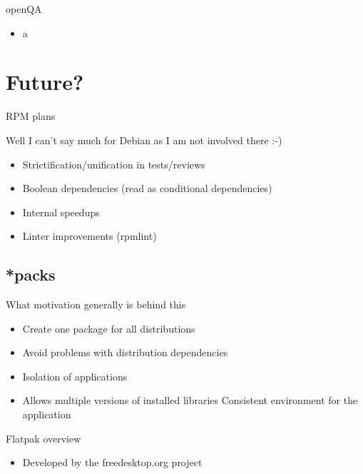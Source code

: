 \documentclass{beamer}
\begin{document}
\begin{frame}[t]{openQA}
	\begin{itemize}
	\item a
	\end{itemize}
\end{frame}

\section{Future?}

\begin{frame}[t]{RPM plans}
    \begin{center}Well I can't say much for Debian as I am not involved there :-)\end{center}
	\begin{itemize}
	\item Strictification/unification in tests/reviews
	\item Boolean dependencies (read as conditional dependencies)
	\item Internal speedups
	\item Linter improvements (rpmlint)
	\end{itemize}
\end{frame}

\subsection{*packs}

\begin{frame}[t]{What motivation generally is behind this}
	\begin{itemize}
	\item Create one package for all distributions
	\item Avoid problems with distribution dependencies
	\item Isolation of applications
	\item Allows multiple versions of installed libraries
	\itme Consistent environment for the application
	\end{itemize}
\end{frame}

\begin{frame}[t]{Flatpak overview}
	\begin{itemize}
	\item Developed by the freedesktop.org project
	\end{itemize}
\end{frame}
\end{document}
